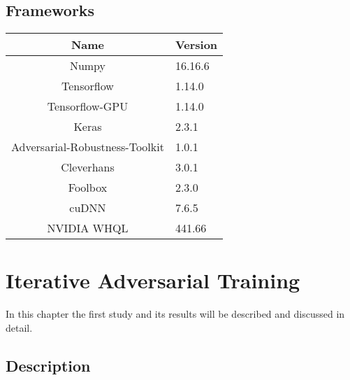 \documentclass[draft,final]{vutinfth} %
\begin{document}
\section{Frameworks}

\begin{table}[h]
  \centering
  \begin{tabular}{cl}
    \toprule
		Name                                & Version   \\
    \midrule
    Numpy                               & 16.16.6	  \\
    Tensorflow                          & 1.14.0    \\
    Tensorflow-GPU                      & 1.14.0    \\
    Keras                               & 2.3.1     \\
    Adversarial-Robustness-Toolkit      & 1.0.1     \\
    Cleverhans                          & 3.0.1     \\
    Foolbox                             & 2.3.0     \\
		cuDNN																&	7.6.5			\\
		NVIDIA WHQL													& 441.66		\\
		
    
    \bottomrule
  \end{tabular}
\end{table}


\chapter{Iterative Adversarial Training}
In this chapter the first study and its results will be described and discussed in detail.

\section{Description}
\end{document}
